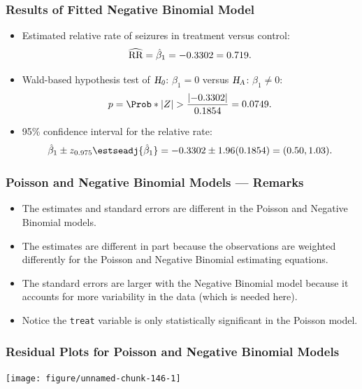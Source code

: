 \documentclass[oneside]{book}\usepackage[]{graphicx}\usepackage[svgnames]{xcolor}
\makeatletter
\newenvironment{kframe}{%
 \def\at@end@of@kframe{}%
 \ifinner\ifhmode%
  \def\at@end@of@kframe{\end{minipage}}%
  \begin{minipage}{\columnwidth}%
 \fi\fi%
 \def\FrameCommand##1{\hskip\@totalleftmargin \hskip-\fboxsep
 \colorbox{shadecolor}{##1}\hskip-\fboxsep
     \hskip-\linewidth \hskip-\@totalleftmargin \hskip\columnwidth}%
 \MakeFramed {\advance\hsize-\width
   \@totalleftmargin\z@ \linewidth\hsize
   \@setminipage}}%
 {\par\unskip\endMakeFramed%
 \at@end@of@kframe}
\newenvironment{knitrout}{}{} %
\let\exp\relax%
\newcommand{\HN}{\textsl{H}_{\textsl{0}}}%
\newcommand{\HA}{\textsl{H}_{\textsl{A}}}%
\newcommand{\RR}{\text{RR}}%
\DeclarePairedDelimiter\abs{\lvert}{\rvert}
\makeatother
\begin{document}
\subsubsection*{Results of Fitted Negative Binomial Model}
\begin{itemize}
    \item Estimated relative rate of seizures in treatment versus control:
          \[ \widehat{\RR}=\exp{\hat{\beta}_1}=\exp{-0.3302}=0.719. \]
    \item Wald-based hypothesis test of $ \HN $: $ \beta_1=0 $ versus $ \HA $: $ \beta_1\ne 0 $:
          \[ p=\Prob*{\abs{Z}>\frac{\abs{-0.3302}}{0.1854}}=0.0749. \]
    \item 95\% confidence interval for the relative rate:
          \[ \exp{\hat{\beta}_1\pm z_{0.975}\estseadj{\hat{\beta}_1}}=\exp{-0.3302\pm 1.96(0.1854)}=(0.50,1.03). \]
\end{itemize}
\subsubsection*{Poisson and Negative Binomial Models --- Remarks}
\begin{itemize}
    \item The estimates and standard errors are different in the Poisson and Negative
          Binomial models.
    \item The estimates are different in part because the observations are weighted
          differently for the Poisson and Negative Binomial estimating equations.
    \item The standard errors are larger with the Negative Binomial model because it
          accounts for more variability in the data (which is needed here).
    \item Notice the \texttt{treat} variable is only statistically significant in the Poisson model.
\end{itemize}
\subsubsection*{Residual Plots for Poisson and Negative Binomial Models}
\begin{knitrout}
\color{fgcolor}\begin{kframe}


{\ttfamily\noindent\bfseries\color{errorcolor}{Error in log(epi.dat\$fitted.values2): non-numeric argument to mathematical function}}\end{kframe}

{\centering \texttt{[image: figure/unnamed-chunk-146-1]} 

}


\end{knitrout}
\end{document}

